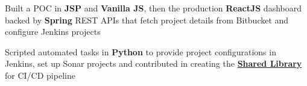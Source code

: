\documentclass[]{resume-openfont}
\newcommand{\resumeHeading}[4]{\runsubsection{\uppercase{#1}}\descript{ | #2}\hfill\location{#3  #4}\fakeNewLine}
\newcommand{\projectHeading}[3]{\Project{#1}{#2}
\descript{#3}\\}
\begin{document}
\begin{bullets}
    \item Built a POC in \textbf{JSP} and \textbf{Vanilla JS}, then the production \textbf{ReactJS} dashboard backed by \textbf{Spring} REST APIs that fetch project details from Bitbucket and configure Jenkins projects
    \item Scripted automated tasks in \textbf{Python} to provide project configurations in Jenkins, set up Sonar projects and contributed in creating the \textbf{\href{https://www.jenkins.io/doc/book/pipeline/shared-libraries/}{Shared Library}} for CI/CD pipeline
\end{bullets}
\sectionsep

\sectionsep



\end{document}
